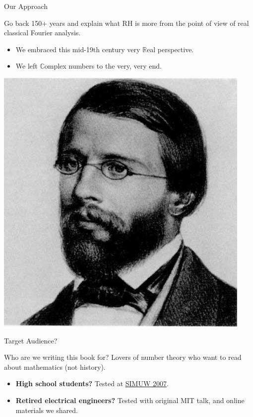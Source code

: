 \documentclass{beamer}
\begin{document}
\begin{frame}{Our Approach}
  \begin{block}{}
    Go back 150+ years and explain what RH is more from the point of view of real classical Fourier analysis.
            \begin{itemize}
              \item We embraced this mid-19th century very $\mathbb{R}$eal perspective.
              \item We left $\mathbb{C}$omplex numbers to the very, very end.
            \end{itemize}
  \end{block}
  \begin{center}
    \includegraphics[height=.4\textheight]{pics/riemann}
  \end{center}

\end{frame}


\begin{frame}{Target Audience?}

\begin{block}{Who are we writing this book for?}
Lovers of number theory who want to read about mathematics (not history).

  \begin{itemize}
    \item \textbf{High school students?} Tested at \href{https://wstein.org/edu/2007/simuw07/}{SIMUW 2007}.
    \item \textbf{Retired electrical engineers?}  Tested with original MIT talk, and  online materials we shared.
  \end{itemize}

\end{block}

\end{frame}
\end{document}
